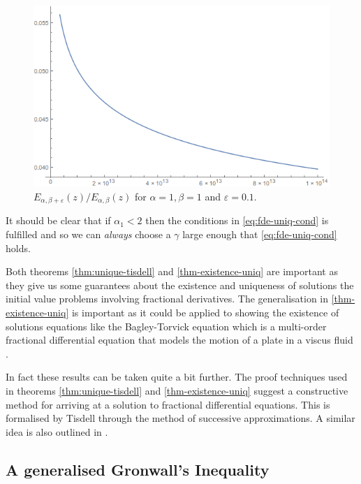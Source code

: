 \begin{figure}[H]
\includegraphics[scale=0.6]{images/Mittag-Leffler-Quotient}
\caption{$ E_{\alpha, \beta + \varepsilon}(z) / E_{\alpha, \beta}(z) $ for $ \alpha = 1, \beta = 1 $ and $ \varepsilon = 0.1 $.}
\label{fig:mittag-quotient}
\end{figure}

It should be clear that if $ \alpha_1 < 2 $ then the conditions in \ref{eq:fde-uniq-cond} is fulfilled and so we can \emph{always} choose a $ \gamma $ large enough that \eqref{eq:fde-uniq-cond} holds.


Both theorems \ref{thm:unique-tisdell} and \ref{thm-existence-uniq} are important as they give us some guarantees about the existence and uniqueness of solutions the initial value problems involving fractional derivatives. The generalisation in \ref{thm-existence-uniq} is important as it could be applied to showing the existence of solutions equations like the Bagley-Torvick equation which is a multi-order fractional differential equation that models the motion of a plate in a viscus fluid \cite{Diethelm2002-3, Podlubny1999, Torvik1984}.

In fact these results can be taken quite a bit further. The proof techniques used in theorems \ref{thm:unique-tisdell} and \ref{thm-existence-uniq} suggest a constructive method for arriving at a solution to fractional differential equations. This is formalised by Tisdell \cite{Tisdell2012} through the method of successive approximations. A similar idea is also outlined in \cite{Podlubny1999}.

\subsection{A generalised Gronwall's Inequality}

